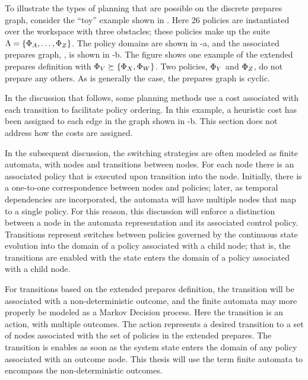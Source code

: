 To illustrate the types of planning that are possible on the discrete
prepares graph, consider the ``toy'' example shown in
.  Here 26 policies are instantiated over the
workspace with three obstacles; these policies make up the suite
$\Lambda = \left\{ \Phi_A, \dots, \Phi_Z \right\}$.  The policy domains are shown
in -a, and the associated prepares graph,
\GL, is shown in -b.  The figure shows one
example of the extended prepares definition with $\Phi_V \succeq
\left\{ \Phi_X, \Phi_W \right\}$.  Two policies, $\Phi_Y$ and $\Phi_Z$, do not
prepare any others.  As is generally the case, the prepares graph is
cyclic.

In the discussion that follows, some planning methods use a cost associated with each
transition to facilitate policy ordering.  In this example, a heuristic cost has been
assigned to each edge in the graph shown in -b.  This
section does not address how the costs are assigned.

In the subsequent discussion, the switching strategies are often
modeled as finite automata, with nodes and transitions between nodes.
For each node there is an associated policy that is executed upon
transition into the node.  Initially, there is a one-to-one
correspondence between nodes and policies; later, as temporal
dependencies are incorporated, the automata will have multiple nodes
that map to a single policy.  For this reason, this discussion will
enforce a distinction between a node in the automata representation
and its associated control policy.  Transitions represent switches
between policies governed by the continuous state evolution into the
domain of a policy associated with a child node; that is, the
transitions are enabled with the state enters the domain of a policy
associated with a child node.  

For transitions based on the extended prepares definition, the
transition will be associated with a non-deterministic outcome, and the
finite automata may more properly be modeled as a Markov Decision
process.  Here the transition is an action, with multiple outcomes.
The action represents a desired transition to a set of nodes
associated with the set of policies in the extended prepares.  The
transition is enables as soon as the system state enters the domain of
any policy associated with an outcome node.  This thesis will use the
term finite automata to encompass the non-deterministic outcomes.


